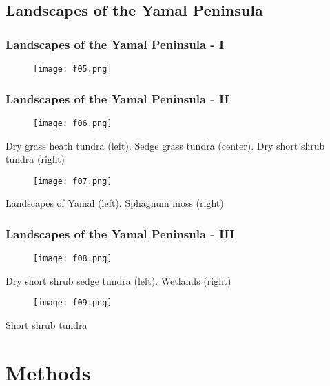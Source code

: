 \documentclass[pdflatex,compress,8pt,
	xcolor={dvipsnames,dvipsnames,svgnames,x11names,table},
	hyperref={colorlinks = true,breaklinks = true, urlcolor = NavyBlue, breaklinks = true}]{beamer}
\begin{document}
\subsection{Landscapes of the Yamal Peninsula}

\begin{frame}\frametitle{Landscapes of the Yamal Peninsula - I}
\begin{figure}[H]
	\centering
		\texttt{[image: f05.png]}
\end{figure}
\end{frame}

\begin{frame}\frametitle{Landscapes of the Yamal Peninsula - II}
\begin{figure}[H]
	\centering
		\texttt{[image: f06.png]}
\end{figure}
Dry grass heath tundra (left). Sedge grass tundra (center). Dry short shrub tundra (right)
\begin{figure}[H]
	\centering
		\texttt{[image: f07.png]}
\end{figure}
Landscapes of Yamal (left). Sphagnum moss (right)
\end{frame}

\begin{frame}\frametitle{Landscapes of the Yamal Peninsula - III}
\begin{figure}[H]
	\centering
		\texttt{[image: f08.png]}
\end{figure}
Dry short shrub sedge tundra (left). Wetlands (right)
\begin{figure}[H]
	\centering
		\texttt{[image: f09.png]}
\end{figure}
Short shrub tundra
\end{frame}

\section{Methods} 
\end{document}
